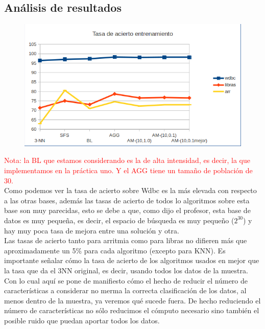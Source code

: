 \documentclass[10pt,a4paper]{article}
\begin{document}
\subsection{\color[rgb]{0.0,0.0,0.51}Análisis de resultados}


\begin{figure}[H]
\centering
\includegraphics[width=130mm]{tasa_train_am.png}
\end{figure}

\textcolor{red}{Nota: la BL que estamos considerando es la de alta intensidad, es decir, la que implementamos en la práctica uno. Y el AGG tiene un tamaño de población de 30.}\\

Como podemos ver la tasa de acierto sobre Wdbc es la más elevada con respecto a las otras bases, además las tasas de acierto de todos lo algoritmos sobre esta base son muy parecidas, esto se debe a que, como dijo el profesor, esta base de datos es muy pequeña, es decir, el espacio de búsqueda es muy pequeño ($2^{30}$) y hay muy poca tasa de mejora entre una solución y otra.\\

Las tasas de acierto tanto para arritmia como para libras no difieren más que aproximadamente un 5\% para cada algoritmo (excepto para KNN). Es importante señalar cómo la tasa de acierto de los algoritmos usados en mejor que la tasa que da el 3NN original, es decir, usando todos los datos de la muestra. Con lo cual aquí se pone de manifiesto cómo el hecho de reducir el número de características a considerar no merma la correcta clasificación de los datos, al menos dentro de la muestra, ya veremos qué sucede fuera. De hecho reduciendo el número de características no sólo reducimos el cómputo necesario sino también el posible ruido que puedan aportar todos los datos.\\
\end{document}
